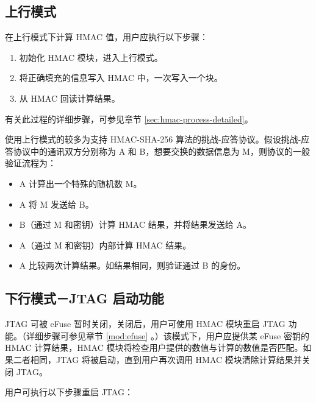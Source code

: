 \documentclass[main\_\_CN.tex]{subfiles}
\begin{document}
\subsection{上行模式}

在上行模式下计算 HMAC 值，用户应执行以下步骤：

\begin{enumerate}
    \item 初始化 HMAC 模块，进入上行模式。
    \item 将正确填充的信息写入 HMAC 中，一次写入一个块。
    \item 从 HMAC 回读计算结果。
\end{enumerate}

有关此过程的详细步骤，可参见章节 \ref{sec:hmac-process-detailed}。

\begin{tiplisting}
使用上行模式的较多为支持 HMAC-SHA-256 算法的挑战-应答协议。假设挑战-应答协议中的通讯双方分别称为 A 和 B，想要交换的数据信息为 M，则协议的一般验证流程为：

\begin{itemize}
    \item A 计算出一个特殊的随机数 M。
    \item A 将 M 发送给 B。
    \item B（通过 M 和密钥）计算 HMAC 结果，并将结果发送给 A。
    \item A（通过 M 和密钥）内部计算 HMAC 结果。
    \item A 比较两次计算结果。如结果相同，则验证通过 B 的身份。
\end{itemize}
\end{tiplisting}

\subsection{下行模式－JTAG 启动功能}

JTAG 可被 eFuse 暂时关闭，关闭后，用户可使用 HMAC 模块重启 JTAG 功能。（详细步骤可参见章节 \ref{mod:efuse} \textit{}。）该模式下，用户应提供某 eFuse 密钥的 HMAC 计算结果，HMAC 模块将检查用户提供的数值与计算的数值是否匹配。如果二者相同，JTAG 将被启动，直到用户再次调用 HMAC 模块清除计算结果并关闭 JTAG。

用户可执行以下步骤重启 JTAG：
\end{document}
